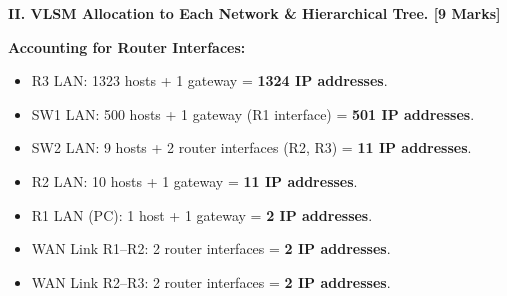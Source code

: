 \documentclass[11pt,a4paper]{article}
\begin{document}
\vspace{0.2cm}
\textbf{II. VLSM Allocation to Each Network \& Hierarchical Tree. [9 Marks]}

\textbf{Accounting for Router Interfaces:}
\begin{itemize}
    \item R3 LAN: 1323 hosts + 1 gateway = \textbf{1324 IP addresses}.
    \item SW1 LAN: 500 hosts + 1 gateway (R1 interface) = \textbf{501 IP addresses}.
    \item SW2 LAN: 9 hosts + 2 router interfaces (R2, R3) = \textbf{11 IP addresses}.
    \item R2 LAN: 10 hosts + 1 gateway = \textbf{11 IP addresses}.
    \item R1 LAN (PC): 1 host + 1 gateway = \textbf{2 IP addresses}.
    \item WAN Link R1--R2: 2 router interfaces = \textbf{2 IP addresses}.
    \item WAN Link R2--R3: 2 router interfaces = \textbf{2 IP addresses}.
\end{itemize}
\end{document}
